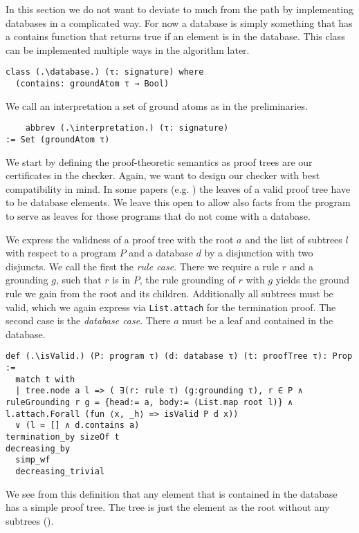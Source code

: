 In this section we do not want to deviate to much from the path by implementing databases in a complicated way. For now a database is simply something that has a contains function that returns true if an element is in the database. This class can be implemented multiple ways in the algorithm later.

\begin{lstlisting}
class (.\database.) (τ: signature) where
  (contains: groundAtom τ → Bool)
\end{lstlisting}

We call an interpretation a set of ground atoms as in the preliminaries.
\begin{lstlisting}
    abbrev (.\interpretation.) (τ: signature)
:= Set (groundAtom τ)
\end{lstlisting}

We start by defining the proof-theoretic semantics as proof trees are our certificates in the checker. Again, we want to design our checker with best compatibility in mind. In some papers (e.g. \cite{ComplexityProvDatalog}) the leaves of a valid proof tree have to be database elements. We leave this open to allow also facts from the program to serve as leaves for those programs that do not come with a database.

We express the validness of a proof tree with the root $a$ and the list of subtrees $l$ with respect to a program $P$ and a database $d$ by a disjunction with two disjuncts. We call the first the \textit{rule case}. There we require a rule $r$ and a grounding $g$, such that $r$ is in $P$, the rule grounding of $r$ with $g$ yields the ground rule we gain from the root and its children. Additionally all subtrees must be valid, which we again express via \lstinline|List.attach| for the termination proof. 
The second case is the \textit{database case}. There $a$ must be a leaf and contained in the database.

\begin{lstlisting}
def (.\isValid.) (P: program τ) (d: database τ) (t: proofTree τ): Prop :=
  match t with
  | tree.node a l => ( ∃(r: rule τ) (g:grounding τ), r ∈ P ∧ ruleGrounding r g = {head:= a, body:= (List.map root l)} ∧ l.attach.Forall (fun ⟨x, _h⟩ => isValid P d x)) 
  ∨ (l = [] ∧ d.contains a)
termination_by sizeOf t
decreasing_by
  simp_wf
  decreasing_trivial
\end{lstlisting}

We see from this definition that any element that is contained in the database has a simple proof tree. The tree is just the element as the root without any subtrees (\databaseElementsHaveValidProofTree). 

